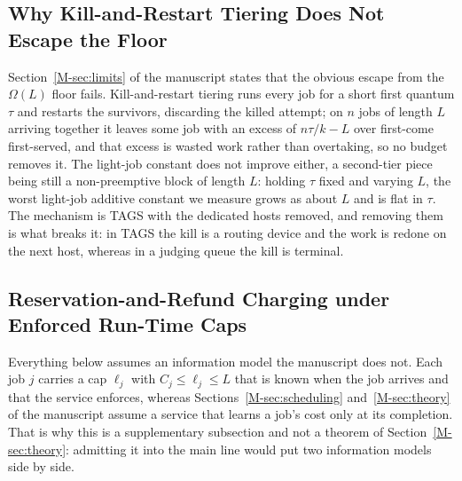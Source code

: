\subsection{Why Kill-and-Restart Tiering Does Not Escape the Floor}
\label{sec:supp_tiering}

Section~\ref*{M-sec:limits} of the manuscript states that the obvious escape from the $\Omega(L)$ floor
fails. Kill-and-restart tiering runs every job for a short first quantum $\tau$ and
restarts the survivors, discarding the killed attempt; on $n$ jobs of length $L$ arriving
together it leaves some job with an excess of $n\tau/k - L$ over first-come first-served,
and that excess is wasted work rather than overtaking, so no budget removes it. The
light-job constant does not improve either, a second-tier piece being still a
non-preemptive block of length $L$: holding $\tau$ fixed and varying $L$, the worst
light-job additive constant we measure grows as about $L$ and is flat in
$\tau$. The mechanism is TAGS \cite{harcholbalter2002tags} with the dedicated hosts
removed, and removing them is what breaks it: in TAGS the kill is a routing device and
the work is redone on the next host, whereas in a judging queue the kill is terminal.

\subsection{Reservation-and-Refund Charging under Enforced Run-Time Caps}
\label{sec:supp_reservation}

Everything below assumes an information model the manuscript does not. Each job $j$
carries a cap $\ell_j$ with $C_j \le \ell_j \le L$ that is known when the job arrives and
that the service enforces, whereas Sections~\ref*{M-sec:scheduling} and~\ref*{M-sec:theory} of the manuscript assume a service
that learns a job's cost only at its completion. That is why this is a supplementary
subsection and not a
theorem of Section~\ref*{M-sec:theory}: admitting it into the main line would put two information models
side by side.


